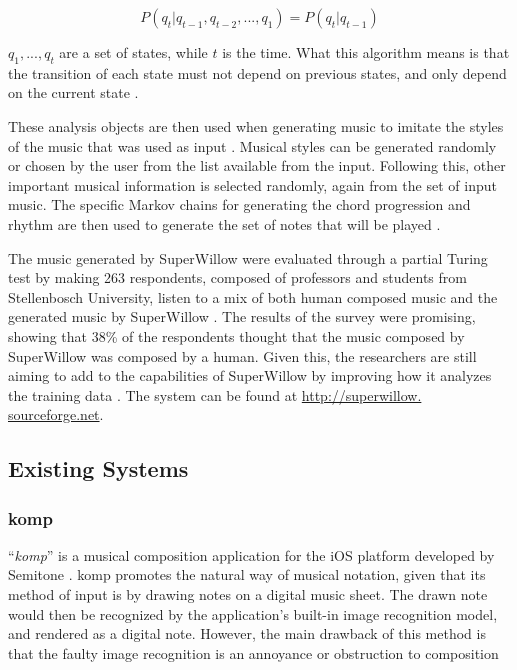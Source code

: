 \begin{equation}
P(q_t|q_{t-1},q_{t-2},...,q_1) = P(q_t|q_{t-1})
\end{equation}

		$q_1,...,q_t$ are a set of states, while $t$ is the time. What this algorithm means is that the transition of each state must not depend on previous states, and only depend on the current state \citep{schulze2011music}. 
        
        These analysis objects are then used when generating music to imitate the styles of the music that was used as input \citep{schulze2011music}. Musical styles can be generated randomly or chosen by the user from the list available from the input. Following this, other important musical information is selected randomly, again from the set of input music. The specific Markov chains for generating the chord progression and rhythm are then used to generate the set of notes that will be played \citep{schulze2011music}. 
        
        The music generated by SuperWillow were evaluated through a partial Turing test by making 263 respondents, composed of professors and students from Stellenbosch University, listen to a mix of both human composed music and the generated music by SuperWillow \citep{schulze2011music}. The results of the survey were promising, showing that 38\% of the respondents thought that the music composed by SuperWillow was composed by a human. Given this, the researchers are still aiming to add to the capabilities of SuperWillow by improving how it analyzes the training data \cite{schulze2011music}. The system can be found at \url{http://superwillow. sourceforge.net}.
        
	\subsection{Existing Systems}
        \subsubsection{komp}
        
        ``\textit{komp}'' is a musical composition application for the iOS platform developed by Semitone \citep{macdonald2017komp}. komp promotes the natural way of musical notation, given that its method of input is by drawing notes on a digital music sheet. The drawn note would then be recognized by the application's built-in image recognition model, and rendered as a digital note. However, the main drawback of this method is that the faulty image recognition is an annoyance or obstruction to composition \citep{macdonald2017komp} 
        
